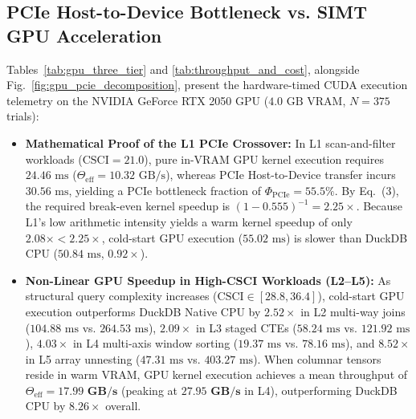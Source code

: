 \documentclass[10pt,a4paper]{article}
\begin{document}
\subsection{PCIe Host-to-Device Bottleneck vs. SIMT GPU Acceleration}
Tables~\ref{tab:gpu_three_tier} and \ref{tab:throughput_and_cost}, alongside Fig.~\ref{fig:gpu_pcie_decomposition}, present the hardware-timed CUDA execution telemetry on the NVIDIA GeForce RTX 2050 GPU ($4.0\text{ GB}$ VRAM, $N=375$ trials):
\begin{itemize}[leftmargin=1.5em,itemsep=2pt]
    \item \textbf{Mathematical Proof of the L1 PCIe Crossover:} In L1 scan-and-filter workloads ($\text{CSCI}=21.0$), pure in-VRAM GPU kernel execution requires $24.46\text{ ms}$ ($\Theta_{\text{eff}} = 10.32\text{ GB/s}$), whereas PCIe Host-to-Device transfer incurs $30.56\text{ ms}$, yielding a PCIe bottleneck fraction of $\Phi_{\text{PCIe}} = 55.5\%$. By Eq.~(3), the required break-even kernel speedup is $(1 - 0.555)^{-1} = \mathbf{2.25\times}$. Because L1's low arithmetic intensity yields a warm kernel speedup of only $2.08\times < 2.25\times$, cold-start GPU execution ($55.02\text{ ms}$) is slower than DuckDB CPU ($50.84\text{ ms}$, $0.92\times$).
    \item \textbf{Non-Linear GPU Speedup in High-CSCI Workloads (L2--L5):} As structural query complexity increases ($\text{CSCI} \in [28.8, 36.4]$), cold-start GPU execution outperforms DuckDB Native CPU by $\mathbf{2.52\times}$ in L2 multi-way joins ($104.88\text{ ms}$ vs. $264.53\text{ ms}$), $\mathbf{2.09\times}$ in L3 staged CTEs ($58.24\text{ ms}$ vs. $121.92\text{ ms}$), $\mathbf{4.03\times}$ in L4 multi-axis window sorting ($19.37\text{ ms}$ vs. $78.16\text{ ms}$), and $\mathbf{8.52\times}$ in L5 array unnesting ($47.31\text{ ms}$ vs. $403.27\text{ ms}$). When columnar tensors reside in warm VRAM, GPU kernel execution achieves a mean throughput of $\Theta_{\text{eff}} = \mathbf{17.99\text{ GB/s}}$ (peaking at $\mathbf{27.95\text{ GB/s}}$ in L4), outperforming DuckDB CPU by $\mathbf{8.26\times}$ overall.
\end{itemize}
\end{document}
